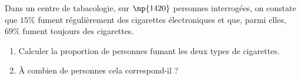 \begin{exo}{}
	Dans un centre de tabacologie, sur $\np{1420}$ personnes interrogées, on constate que $15\%$ fument régulièrement des cigarettes électroniques et que, parmi elles, $69\%$ fument toujours des cigarettes.
	\begin{enumerate}
		\item Calculer la proportion de personnes fumant les deux types de cigarettes.
		\item À combien de personnes cela correspond-il ?
	\end{enumerate}
\end{exo}
